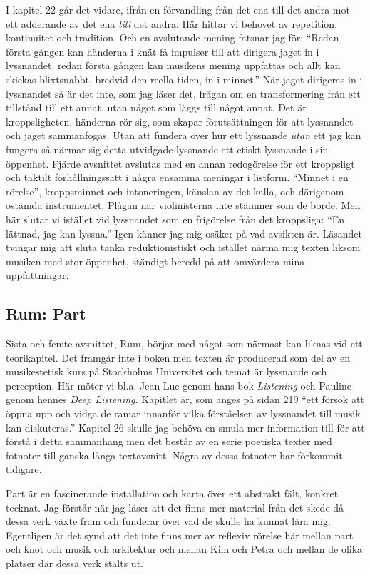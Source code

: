 \documentclass[a4paper]{article}
\begin{document}
I kapitel 22 går det vidare, ifrån en förvandling från det ena till det andra mot ett adderande av det ena \emph{till} det andra. Här hittar vi behovet av repetition, kontinuitet och tradition. Och en avslutande mening fatsnar jag för: ``Redan första gången kan händerna i knät få impulser till att dirigera jaget in i lyssnandet, redan första gången kan musikens mening uppfattas och allt kan skickas blixtsnabbt, bredvid den reella tiden, in i minnet.'' När jaget dirigeras in i lyssnandet så är det inte, som jag läser det, frågan om en transformering från ett tillstånd till ett annat, utan något som läggs till något annat. Det är kroppsligheten, händerna rör sig, som skapar förutsättningen för att lyssnandet och jaget sammanfogas. Utan att fundera över hur ett lyssnande \emph{utan} ett jag kan fungera så närmar sig detta utvidgade lyssnande ett etiskt lyssnande i sin öppenhet. Fjärde avsnittet avslutas med en annan redogörelse för ett kroppsligt och taktilt förhållningssätt i några ensamma meningar i listform. ``Minnet i en rörelse'', kroppsminnet och intoneringen, känslan av det kalla, och därigenom ostämda instrumentet. Plågan när violinisterna inte stämmer som de borde. Men här slutar vi istället vid lyssnandet som en frigörelse från det kroppsliga: ``En lättnad, jag kan lyssna.'' Igen känner jag mig osäker på vad avsikten är. Läsandet tvingar mig att sluta tänka reduktionistiskt och istället närma mig texten liksom musiken med stor öppenhet, ständigt beredd på att omvärdera mina uppfattningar. 

\subsection*{Rum: Part}

Sista och femte avsnittet, Rum, börjar med något som närmast kan liknas vid ett teorikapitel. Det framgår inte i boken men texten är producerad som del av en musikestetisk kurs på Stockholms Universitet och temat är lyssnande och perception. Här möter vi bl.a. Jean-Luc \citet{nancy2007} genom hans bok \emph{Listening} och Pauline \cite{oliveros05} genom hennes \emph{Deep Listening}. Kapitlet är, som anges på sidan 219 ``ett försök att öppna upp och vidga de ramar innanför vilka förståelsen av lyssnandet till musik kan diskuteras.'' Kapitel 26 skulle jag behöva en smula mer information till för att förstå i detta sammanhang men det består av en serie poetiska texter med fotnoter till ganska långa textavsnitt. Några av dessa fotnoter har förkommit tidigare. 

Part är en fascinerande installation och karta över ett abstrakt fält, konkret tecknat. Jag förstår när jag läser att det finns mer material från det skede då dessa verk växte fram och funderar över vad de skulle ha kunnat lära mig. Egentligen är det synd att det inte finns mer av reflexiv rörelse här mellan part och knot och musik och arkitektur och mellan Kim och Petra och mellan de olika platser där dessa verk stälts ut.
\end{document}
